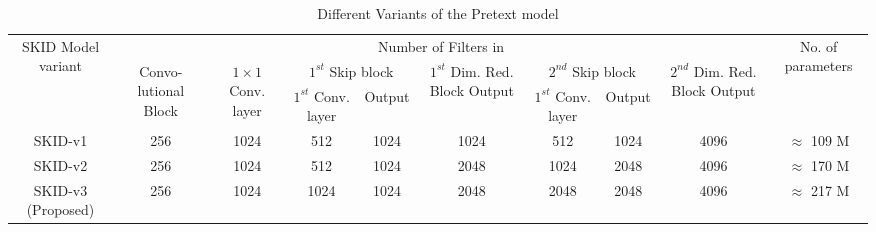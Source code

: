 \documentclass[journal]{IEEEtai}
\begin{document}
\begin{table*}[!h]
    \centering
    \bgroup
    \caption{Different Variants of the Pretext model}
    \def\arraystretch{1.5}
    \begin{tabular}{c|c|c|c|c|c|c|c|c|c}
    \hline
       \multirow{4}{1.5cm}{\centering SKID Model variant} &
       \multicolumn{8}{c|}{Number of Filters in} &
       \multirow{4}{1.5cm}{\centering No. of parameters}\\ \cline{2-9}
       
       {} &
       \multirow{3}{*}{\parbox{1.1cm}{\centering Convo- lutional Block}} &
       \multirow{3}{0.8cm}{\centering $1 \times 1$ Conv. layer} &
       \multicolumn{2}{c|}{\centering $1^{st}$ Skip block} &
       \multirow{3}{1.4cm}{\centering $1^{st}$ Dim. Red. Block Output} &
       \multicolumn{2}{c|}{$2^{nd}$ Skip block} &
       \multirow{3}{1.4cm}{\centering $2^{nd}$ Dim. Red. Block Output} &
       {}\\ \cline{4-5} \cline{7-8}
       
       {} &
       {} &
       {} &
       \multirow{2}{1.4cm}{\centering $1^{st}$ Conv. layer} &
       \multirow{2}{0.9cm}{\centering Output} &
       {} &
       \multirow{2}{1.4cm}{\centering $1^{st}$ Conv. layer} &
       \multirow{2}{0.9cm}{\centering Output} &
       {} &
       {}\\
       
       {} & {} & {} &  {} & {} & {} & {} & {} & {} & {}\\\hline \hline
        
        SKID-v1 & 256 & 1024 & 512 & 1024 & 1024 & 512 & 1024 & 4096 & $\approx$ 109 M\\  \hline
        SKID-v2 & 256 & 1024 & 512 & 1024 & 2048 & 1024 & 2048 & 4096 & $\approx$ 170 M\\  \hline
        \multirow{2}{2cm}{\centering SKID-v3 (Proposed)} & \multirow{2}{*}{256} & \multirow{2}{*}{1024} & \multirow{2}{*}{1024} & \multirow{2}{*}{1024} & \multirow{2}{*}{2048} & \multirow{2}{*}{2048} & \multirow{2}{*}{2048} & \multirow{2}{*}{4096} & \multirow{2}{*}{$\approx$ 217 M}\\  
        {} & {} & {} &  {} & {} & {} & {} & {} & {} & {}\\\hline
    \end{tabular}
    \label{tab:pretext_ablation_filters}
    \egroup
   
\end{table*}
\end{document}

